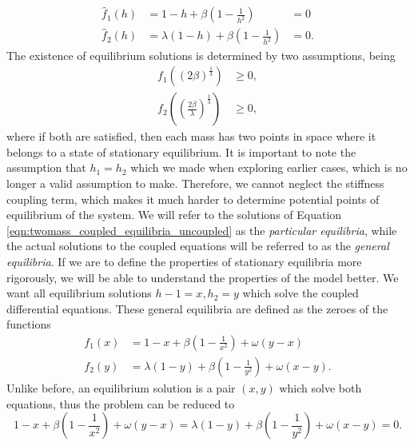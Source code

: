 \documentclass{article}
\begin{document}
\begin{equation}
    \begin{aligned}
        \hat{f}_1(h) &= 1 - h + \beta\left( 1-\frac{1}{h^2} \right) &= 0 \\
        \hat{f}_2(h) &= \lambda(1-h) + \beta\left( 1-\frac{1}{h^2} \right) &= 0.
    \end{aligned}
    \label{eqn:twomass_coupled_equilibria_uncoupled}
\end{equation}
The existence of equilibrium solutions is determined by two assumptions, being
\begin{align*}
    f_1 \left( (2\beta)^\frac{1}{3} \right) &\ge 0, \\
    f_2 \left( \left( \frac{2\beta}{\lambda} \right)^\frac{1}{3} \right) &\ge 0,
\end{align*}
where if both are satisfied, then each mass has two points in space where it belongs to a state of stationary equilibrium.
It is important to note the assumption that \(h_1=h_2\) which we made when exploring earlier cases,
which is no longer a valid assumption to make. 
Therefore, we cannot neglect the stiffness coupling term,
which makes it much harder to determine potential points of equilibrium of the system.
We will refer to the solutions of Equation \ref{eqn:twomass_coupled_equilibria_uncoupled} as the \textit{particular equilibria},
while the actual solutions to the coupled equations will be referred to as the \textit{general equilibria}.
If we are to define the properties of stationary equilibria more rigorously,
we will be able to understand the properties of the model better.
We want all equilibrium solutions \(h-1 = x, h_2 = y\) which solve the coupled differential equations.
These general equilibria are defined as the zeroes of the functions
\begin{equation}
    \begin{aligned}
        f_1(x) &= 1-x + \beta\left(1 - \frac{1}{x^2}\right) + \omega(y-x) \\
        f_2(y) &= \lambda(1-y) + \beta\left(1 - \frac{1}{y^2}\right) + \omega(x-y).
    \end{aligned}
\end{equation}
Unlike before, an equilibrium solution is a pair \((x,y)\) which solve both equations,
thus the problem can be reduced to
\begin{equation}
    1-x + \beta\left(1 - \frac{1}{x^2}\right) + \omega(y-x) = \lambda(1-y) + \beta\left(1 - \frac{1}{y^2}\right) + \omega(x-y) = 0.
    \label{eqn:twomass_noalpha_equilibrium_solutions}
\end{equation}
\end{document}
